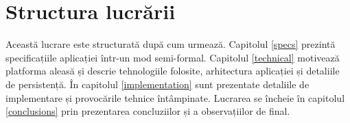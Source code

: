 \section{Structura lucrării}\label{structura_intro}

Această lucrare este structurată după cum urmează. Capitolul \ref{specs} prezintă specificațiile aplicației \AppName într-un mod semi-formal. Capitolul \ref{technical} motivează platforma aleasă și descrie tehnologiile folosite, arhitectura aplicației și detaliile de persistență. În capitolul \ref{implementation} sunt prezentate detaliile de implementare și provocările tehnice întâmpinate. Lucrarea se încheie în capitolul \ref{conclusions} prin prezentarea concluziilor și a observațiilor de final.

